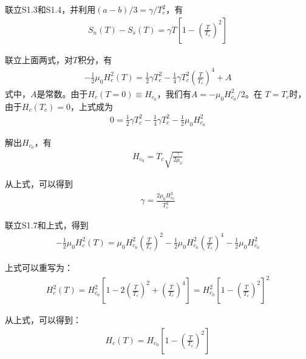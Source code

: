 联立S1.3和S1.4，并利用$(a-b)/3=\gamma/T_c^2$，有
\begin{align*}
S_n(T) − S_s(T)=\gamma T\left[1-\left(\frac{T}{T_c}\right)^2\right]  \tag{S1.6}
\end{align*}

联立上面两式，对$T$积分，有
\begin{align*}
−\frac{1}{2}\mu_0 H_c^2(T) =\frac{1}{2}\gamma T_c^2-
\frac{1}{4}\gamma T_c^2 \left(\frac{T}{T_c}\right)^4+A \tag{S1.7}
\end{align*}
式中，$A$是常数。由于$H_c(T =0)\equiv H_{c_0}$，我们有$A=−\mu_0 H_{c_0}^2 / 2$。在
$T=T_c$时，由于$H_c(T_c)=0$，上式成为
\begin{align*}
0=\frac{1}{2}\gamma T_c^2-\frac{1}{4}\gamma T_c^2-\frac{1}{2}\mu_0 H_{c_0}^2\tag{S1.8}
\end{align*}

解出$H_{c_0}$，有
\begin{align*}
H_{c_0}=T_c\sqrt{\frac{\gamma}{2\mu_0}}\tag{1.6}
\end{align*}

从上式，可以得到
\begin{align*}
\gamma=\frac{2\mu_0 H_{c_0}^2}{T_c^2}\tag{S1.9}
\end{align*}

联立S1.7和上式，得到
\begin{align*}
-\frac{1}{2}\mu_0 H_c^2(T)=\mu_0 H_{c_0}^2 \left(\frac{T}{T_c}\right)^2-\frac{1}{2}\mu_0 H_{c_0}^2 \left(\frac{T}{T_c}\right)^4-\frac{1}{2}\mu_0 H_{c_0}^2\tag{S1.10}
\end{align*}

上式可以重写为：
\begin{align*}
H_c^2(T)=H_{c_0}^2\left[1-2\left(\frac{T}{T_c}\right)^2+\left(\frac{T}{T_c}\right)^4\right]=H_{c_0}^2\left[1-\left(\frac{T}{T_c}\right)^2\right]^2\tag{S1.11}
\end{align*}

从上式，可以得到：
\begin{align*}
H_c(T)=H_{c_0}\left[1-\left(\frac{T}{T_c}\right)^2 \right]\tag{1.7}
\end{align*}

